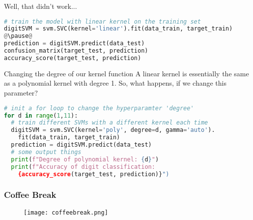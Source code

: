 \begin{frame}[c, fragile]{Well, that didn't work...}
  \pause
  \begin{lstlisting}[language=Python]
# train the model with linear kernel on the training set
digitSVM = svm.SVC(kernel='linear').fit(data_train, target_train)
@\pause@
prediction = digitSVM.predict(data_test)
confusion_matrix(target_test, prediction)
accuracy_score(target_test, prediction)
  \end{lstlisting}
\end{frame}

\begin{frame}[c,fragile]{Changing the degree of our kernel function}
  A linear kernel is essentially the same as a polynomial kernel with
  degree 1. So, what happens, if we change this parameter?
  \pause
  \begin{lstlisting}[language=Python, showstringspaces=false]
# init a for loop to change the hyperparamter 'degree'
for d in range(1,11):
  # train different SVMs with a different kernel each time
  digitSVM = svm.SVC(kernel='poly', degree=d, gamma='auto').
    fit(data_train, target_train)
  prediction = digitSVM.predict(data_test)
  # some output things
  print(f"Degree of polynomial kernel: {d}")
  print(f"Accuracy of digit classification: 
    {accuracy_score(target_test, prediction)}")
  \end{lstlisting}
\end{frame}

\beginbackup

\begin{frame}[c]\frametitle{Coffee Break}
  \begin{figure}[htbp]
    \centering
    \texttt{[image: coffeebreak.png]}
  \end{figure}
\end{frame}

\backupend

